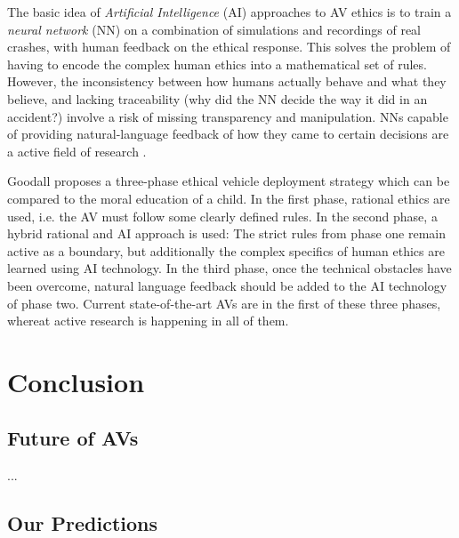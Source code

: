 \documentclass[11pt]{article}
\newcommand{\TODO}[1]{\todo[inline]{{\footnotesize #1}}}
\begin{document}
The basic idea of \textit{Artificial Intelligence} (AI) approaches to AV ethics is to train a \textit{neural network} (NN) on a combination of simulations and recordings of real crashes, with human feedback on the ethical response. This solves the problem of having to encode the complex human ethics into a mathematical set of rules. However, the inconsistency between how humans actually behave and what they believe, and lacking traceability (why did the NN decide the way it did in an accident?) involve a risk of missing transparency and manipulation. NNs capable of providing natural-language feedback of how they came to certain decisions are a active field of research \cite[p. 63]{Goodall2014ethical}.

Goodall proposes a three-phase ethical vehicle deployment strategy \cite[p.63]{Goodall2014ethical} which can be compared to the moral education of a child. In the first phase, rational ethics are used, i.e. the AV must follow some clearly defined rules. In the second phase, a hybrid rational and AI approach is used: The strict rules from phase one remain active as a boundary, but additionally the complex specifics of human ethics are learned using AI technology. In the third phase, once the technical obstacles have been overcome, natural language feedback should be added to the AI technology of phase two. Current state-of-the-art AVs are in the first of these three phases, whereat active research is happening in all of them.

\section{Conclusion}
\TODO{Conclusion}
\subsection{Future of AVs}
...
\subsection{Our Predictions}



%

\end{document}
